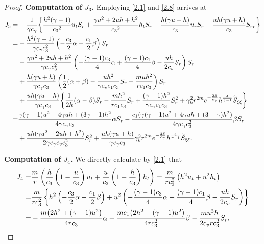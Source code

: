 \documentclass[10pt,a4paper]{amsart}
\begin{document}
\begin{proof}
\noindent\textbf{Computation of $J_3$.} Employing \eqref{2.1} and
\eqref{2.8} arrives at
 \begin{align}
J_3
=& -\frac{1}{\gamma c_\gamma}\bigg\{
       \frac{h^2(\gamma-1)}{{c_3}^2}u_tS_r+\frac{\gamma u^2+2uh+h^2}{{c_3}^2}h_tS_r- \frac{h(\gamma u+h)}{c_3}u_rS_r- \frac{uh(\gamma u+h)}{c_3}S_{rr}\bigg\}\nonumber\\
=&
-\frac{h^2(\gamma-1)}{\gamma c_\gamma c_3^2}\left( -\frac{c_3}{2}\alpha - \frac{c_1}{2}\beta \right)S_r \nonumber \\
&  -\frac{\gamma u^2+2uh+h^2}{\gamma c_\gamma c_3^2}\left( -\frac{(\gamma-1)c_3}{4}\alpha + \frac{(\gamma-1)c_1}{4}\beta - \frac{uh}{2c_v} S_r \right)S_r \nonumber \\
& + \frac{h(\gamma u+h)}{\gamma c_\gamma c_3}\left( \frac12(\alpha+\beta) - \frac{uh^2}{\gamma c_v c_1 c_3} S_r + \frac{m u h^2}{r c_1 c_3} \right)S_r \nonumber \\
& + \frac{uh(\gamma u+h)}{\gamma c_\gamma c_3}\bigg\{ \frac{1}{2h}(\alpha-\beta) S_r - \frac{m h^2}{r c_1 c_3} S_r + \frac{(\gamma-1) h^2}{\gamma c_\gamma c_1 c_3} S_r^2 + \gamma_k^2 r^{2m} e^{-\frac{2S}{c_\gamma}} h^{\frac{4}{\gamma-1}} \widetilde{S}_{\xi\xi} \bigg\}\nonumber\\
= & \frac{\gamma(\gamma+1)u^2+4\gamma uh + (3\gamma-1)h^2}{4\gamma c_\gamma c_3} \alpha S_r
    - \frac{c_1(\gamma(\gamma+1)u^2+4\gamma uh+(3-\gamma)h^2)}{4\gamma c_\gamma c_3^2} \beta S_r  \nonumber\\
& + \frac{uh(\gamma u^2+2uh+h^2)}{2\gamma c_\gamma c_v c_3^2}  S_r^2 +  \frac{uh(\gamma u+h)}{\gamma c_\gamma c_3} \gamma_k^2 r^{2m} e^{-\frac{2S}{c_\gamma}} h^{\frac{4}{\gamma-1}}  \widetilde{S}_{\xi\xi}. \notag
 \end{align}

\noindent\textbf{Computation of $J_4$.} We directly calculate by \eqref{2.1} that
 \begin{align}
 J_4
=& \frac{m}{r}\left( \frac{h}{c_3}\left( 1 - \frac{u}{c_3} \right) u_t + \frac{u}{c_3}\left( 1 - \frac{h}{c_3} \right) h_t \right) = \frac{m}{r c_3^2}\left( h^2 u_t + u^2 h_t \right) \nonumber\\
=& \frac{m}{r c_3^2}\left\{ h^2\left( -\frac{c_3}{2}\alpha - \frac{c_1}{2}\beta \right) + u^2\left( -\frac{(\gamma-1)c_3}{4}\alpha + \frac{(\gamma-1)c_1}{4}\beta - \frac{u h}{2c_v} S_r \right) \right\} \nonumber\\
=& -\frac{m\big( 2h^2 + (\gamma-1)u^2 \big)}{4r c_3} \alpha - \frac{m c_1\big( 2h^2 - (\gamma-1)u^2 \big)}{4r c_3^2} \beta - \frac{m u^3 h}{2c_v r c_3^2} S_r. \notag
 \end{align}


\end{proof}
\end{document}
